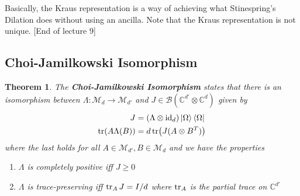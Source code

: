 \documentclass{article}
\newtheorem{theorem}{Theorem}
\theoremstyle{definition}
\newcommand{\id}{\text{id}}
\begin{document}
Basically, the Kraus representation is a way of achieving what Stinespring's
Dilation does without using an ancilla. Note that the Kraus representation
is not unique. [End of lecture 9]

\subsection{Choi-Jamilkowski Isomorphism}

\begin{theorem}
  The \textbf{Choi-Jamilkowski Isomorphism} states that there is an isomorphism
  between $\Lambda: \mathcal{M}_d \to \mathcal{M}_{d'}$ and $J \in \mathcal{B}
  (\mathbb{C}^{d'} \otimes \mathbb{C}^d)$ given by
  \begin{align}
    J &= (\Lambda \otimes \id_d) \ket\Omega \bra\Omega \\
    \tr(A \Lambda(B)) &= d \tr(J(A \otimes B^T))
  \end{align}
  where the last holds for all $A \in \mathcal{M}_{d'}, B \in \mathcal{M}_d$ and
  we have the properties
  \begin{enumerate}
    \item $\Lambda$ is completely positive iff $J \geq 0$
    \item $\Lambda$ is trace-preserving iff $\tr_A J = I / d$ where $\tr_A$ is 
      the partial trace on $\mathbb{C}^{d'}$
  \end{enumerate}
\end{theorem}
\end{document}
